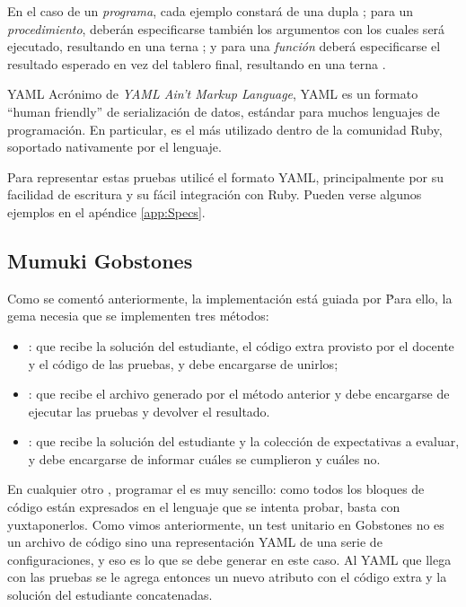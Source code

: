 En el caso de un \emph{programa}, cada ejemplo constará de una dupla ; para un \emph{procedimiento}, deberán especificarse también los argumentos con los cuales será ejecutado, resultando en una terna ; y para una \emph{función} deberá especificarse el resultado esperado en vez del tablero final, resultando en una terna .

\sepfootnotecontent
  {YAML}
  {Acrónimo de \emph{YAML Ain't Markup Language}, YAML es un formato ``human friendly'' de serialización de datos, estándar para muchos lenguajes de programación. En particular, es el más utilizado dentro de la comunidad Ruby, soportado nativamente por el lenguaje.}

Para representar estas pruebas utilicé el formato YAML, principalmente por su facilidad de escritura y su fácil integración con Ruby. Pueden verse algunos ejemplos en el apéndice \ref{app:Specs}.


\subsection{Mumuki Gobstones \runner}
Como se comentó anteriormente, la implementación está guiada por \mumukit\. Para ello, la gema necesia que se implementen tres métodos:
\begin{itemize}
  \item{: que recibe la solución del estudiante, el código extra provisto por el docente y el código de las pruebas, y debe encargarse de unirlos;}
  \item{: que recibe el archivo generado por el método anterior y debe encargarse de ejecutar las pruebas y devolver el resultado.}
  \item{: que recibe la solución del estudiante y la colección de expectativas a evaluar, y debe encargarse de informar cuáles se cumplieron y cuáles no.}
\end{itemize}

En cualquier otro \runner, programar el  es muy sencillo: como todos los bloques de código están expresados en el lenguaje que se intenta probar, basta con yuxtaponerlos. Como vimos anteriormente, un test unitario en Gobstones no es un archivo de código sino una representación YAML de una serie de configuraciones, y eso es lo que se debe generar en este caso. Al YAML que llega con las pruebas se le agrega entonces un nuevo atributo  con el código extra y la solución del estudiante concatenadas.

